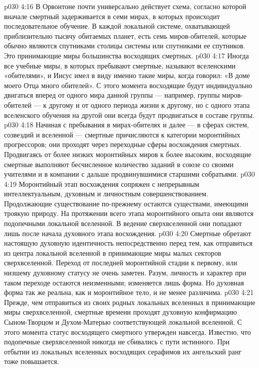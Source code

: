 \vs p030 4:16 \pc В Орвонтоне почти универсально действует схема, согласно которой вначале смертный задерживается в семи мирах, в которых происходит последовательное обучение. В каждой локальной системе, охватывающей приблизительно тысячу обитаемых планет, есть семь миров\hyp{}обителей, которые обычно являются спутниками столицы системы или спутниками ее спутников. Это принимающие миры большинства восходящих смертных.
\vs p030 4:17 Иногда все учебные миры, в которых пребывают смертные, называют вселенскими «обителями», и Иисус имел в виду именно такие миры, когда говорил: «В доме моего Отца много обителей». С этого момента восходящие будут индивидуально двигаться вперед от одного мира данной группы --- например, группы миров\hyp{}обителей --- к другому и от одного периода жизни к другому, но с одного этапа вселенского обучения на другой они всегда будут продвигаться в составе группы.
\vs p030 4:18 \bibnobreakspace {} Начиная с пребывания в мирах\hyp{}обителях и далее --- в сферах систем, созвездий и вселенной --- смертные причисляются к категории моронтийных прогрессоров; они проходят через переходные сферы восхождения смертных. Продвигаясь от более низких моронтийных миров к более высоким, восходящие смертные выполняют бесчисленное количество заданий в союзе со своими учителями и в компании с дальше продвинувшимися старшими собратьями.
\vs p030 4:19 Моронтийный этап восхождения сопряжен с непрерывным интеллектуальным, духовным и личностным совершенствованием. Продолжающие существование по\hyp{}прежнему остаются существами, имеющими троякую природу. На протяжении всего этапа моронтийного опыта они являются подопечными локальной вселенной. В ведение сверхвселенной они попадают лишь после начала духовного этапа восхождения.
\vs p030 4:20 Смертные обретают настоящую духовную идентичность непосредственно перед тем, как отправиться из центра локальной вселенной в принимающие миры малых секторов сверхвселенной. Переход от последней моронтийной стадии к первому, или низшему духовному статусу не очень заметен. Разум, личность и характер при таком переходе остаются неизменными; изменяется лишь форма. Но духовная форма так же реальна, как и моронтийное тело, и не менее различима.
\vs p030 4:21 Прежде, чем отправиться из своих родных локальных вселенных в принимающие миры сверхвселенной, смертные времени проходят духовную конфирмацию Сыном\hyp{}Творцом и Духом\hyp{}Матерью соответствующей локальной вселенной. С этого момента статус восходящего смертного утвержден навсегда. Известно, что подопечные сверхвселенной никогда не сбивались с пути истинного. При отбытии из локальных вселенных восходящих серафимов их ангельский ранг тоже повышается.
